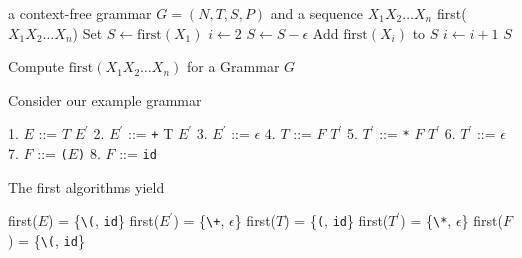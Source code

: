 \documentclass[8pt,a4paper,compress]{beamer}
\newcommand{\mm}[1]{$#1$}
\newcommand{\expo}[2]{$#1^{#2}$}
\newenvironment{spaced}
{
\smallskip
\hspace{.5cm}
\begin{minipage}[c]{\textwidth}
}
{
\end{minipage}
\smallskip
}
\begin{document}
\begin{frame}[fragile]
\pause

\begin{algorithm}[H]
\begin{algorithmic}
\REQUIRE a context-free grammar $G = (N,T,S,P)$ and a sequence $X_1X_2 \dots X_n$
\ENSURE first($X_1X_2 \dots X_n$)
\STATE Set $S \gets \text{first}(X_1)$
\STATE $i \gets 2$
\STATE $S \gets S - \epsilon$
\STATE Add $\text{first}(X_i)$ to $S$
\STATE $i \gets i + 1$
\ENDWHILE
\RETURN $S$
\end{algorithmic}
\caption{Compute $\text{first}(X_1X_2 \dots X_n)$ for a Grammar $G$}
\end{algorithm}
\end{frame}

\begin{frame}[fragile]
\pause

Consider our example grammar

\text{ }
\begin{spaced}
\begin{production}
1. \mm{E}  ::= \mm{T} \expo{E}{\prime}
2. \expo{E}{\prime} ::= \lstinline{+} T \expo{E}{\prime}
3. \expo{E}{\prime} ::= \mm{\epsilon}
4. \mm{T}  ::= \mm{F} \expo{T}{\prime}
5. \expo{T}{\prime} ::= \lstinline{*} \mm{F} \expo{T}{\prime}
6. \expo{T}{\prime} ::= \mm{\epsilon}
7. \mm{F}  ::= \lstinline{(}\mm{E}\lstinline{)}
8. \mm{F}  ::= \lstinline{id}
\end{production}
\end{spaced}

\pause
\bigskip

The first algorithms yield

\text{ }
\begin{spaced}
\begin{production}
first(\mm{E})  = \{\lstinline{\(}, \lstinline{id}\}
first(\expo{E}{\prime}) = \{\lstinline{\+}, \mm{\epsilon}\}
first(\mm{T})  = \{\lstinline{(}, \lstinline{id}\}
first(\expo{T}{\prime}) = \{\lstinline{\*}, \mm{\epsilon}\}
first(\mm{F})  = \{\lstinline{\(}, \lstinline{id}\}
\end{production}
\end{spaced}
\end{frame}
\end{document}

